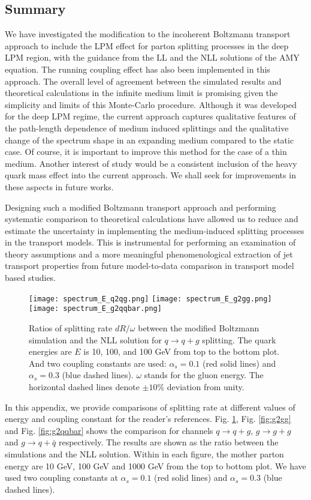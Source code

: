 \subsection{Summary}
We have investigated the modification to the incoherent Boltzmann transport approach to include the LPM effect for parton splitting processes in the deep LPM region, with the guidance from the LL and the NLL solutions of the AMY equation.
The running coupling effect has also been implemented in this approach.
The overall level of agreement between the simulated results and theoretical calculations in the infinite medium limit is promising given the simplicity and limits of this Monte-Carlo procedure. 
Although it was developed for the deep LPM regime, the current approach captures qualitative features of the path-length dependence of medium induced splittings and the qualitative change of the spectrum shape in an expanding medium compared to the static case.
Of course, it is important to improve this method for the case of a thin medium.
Another interest of study would be a consistent inclusion of the heavy quark mass effect into the current approach.
We shall seek for improvements in these aspects in future works.

Designing such a modified Boltzmann transport approach and performing systematic comparison to theoretical calculations have allowed us to reduce and estimate the uncertainty in implementing the medium-induced splitting processes in the transport models. 
This is instrumental for performing an examination of theory assumptions and a more meaningful phenomenological extraction of jet transport properties from future model-to-data comparison in transport model based studies.

\begin{figure}
\texttt{[image: spectrum\_E\_q2qg.png]}
\texttt{[image: spectrum\_E\_g2gg.png]}
\texttt{[image: spectrum\_E\_g2qqbar.png]}
\caption{Ratios of splitting rate $dR/\omega$ between the modified Boltzmann simulation and the NLL solution for $q\rightarrow q+g$ splitting. The quark energies are $E$ is 10, 100, and 100 GeV from top to the bottom plot. 
And two coupling constants are used: $\alpha_s = 0.1$ (red solid lines) and $\alpha_s = 0.3$ (blue dashed lines).
$\omega$ stands for the gluon energy.
The horizontal dashed lines denote $\pm 10\%$ deviation from unity. }
\label{fig:q2qg}
\end{figure}

In this appendix, we provide comparisons of splitting rate at different values of energy and coupling constant for the reader's references.
Fig. \ref{fig:q2qg}, Fig. \ref{fig:g2gg} and Fig. \ref{fig:g2qqbar} shows the comparison for channels $q\rightarrow q+g$, $g\rightarrow g+g$ and $g\rightarrow q+\bar{q}$ respectively.
The results are shown as the ratio between the simulations and the NLL solution.
Within in each figure, the mother parton energy are 10 GeV, 100 GeV and 1000 GeV from the top to bottom plot.
We have used two coupling constants at $\alpha_s = 0.1$ (red solid lines) and $\alpha_s = 0.3$ (blue dashed lines).

